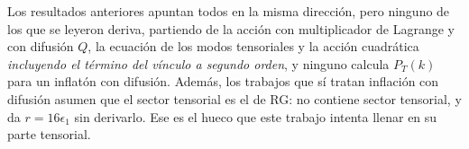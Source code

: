 \begin{resultado}
Los resultados anteriores apuntan todos en la misma dirección, pero ninguno de los que se leyeron deriva, partiendo de la acción con multiplicador de Lagrange y con difusión $Q$, la ecuación de los modos tensoriales y la acción cuadrática \emph{incluyendo el término del vínculo a segundo orden}, y ninguno calcula $P_T(k)$ para un inflatón con difusión. Además, los trabajos que sí tratan inflación con difusión \cite{leon22,piccirilli23} asumen que el sector tensorial es el de RG: \cite{leon22} no contiene sector tensorial, y \cite{piccirilli23} da $r=16\epsilon_1$ sin derivarlo. Ese es el hueco que este trabajo intenta llenar en su parte tensorial.
\end{resultado}

